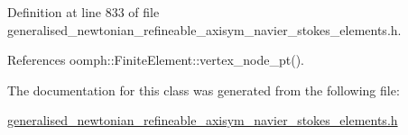 Definition at line 833 of file generalised\+\_\+newtonian\+\_\+refineable\+\_\+axisym\+\_\+navier\+\_\+stokes\+\_\+elements.\+h.



References oomph\+::\+Finite\+Element\+::vertex\+\_\+node\+\_\+pt().



The documentation for this class was generated from the following file\+:\begin{DoxyCompactItemize}
\item 
\hyperlink{generalised__newtonian__refineable__axisym__navier__stokes__elements_8h}{generalised\+\_\+newtonian\+\_\+refineable\+\_\+axisym\+\_\+navier\+\_\+stokes\+\_\+elements.\+h}\end{DoxyCompactItemize}
